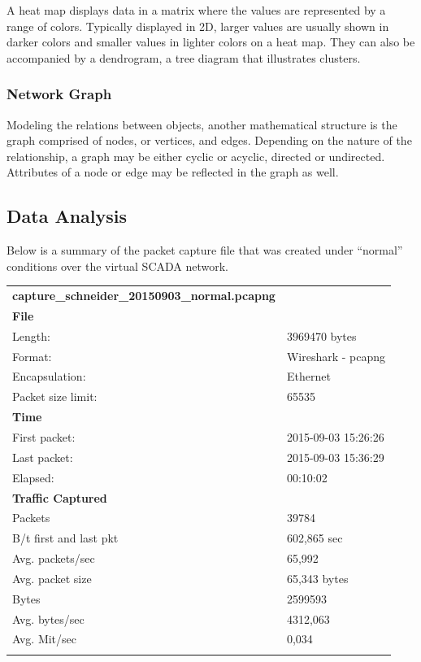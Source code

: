 \documentclass[11pt,]{article}
\begin{document}
A heat map displays data in a matrix where the values are represented by
a range of colors. Typically displayed in 2D, larger values are usually
shown in darker colors and smaller values in lighter colors on a heat
map. They can also be accompanied by a dendrogram, a tree diagram that
illustrates clusters.

\subsubsection{Network Graph}\label{network-graph}

Modeling the relations between objects, another mathematical structure
is the graph comprised of nodes, or vertices, and edges. Depending on
the nature of the relationship, a graph may be either cyclic or acyclic,
directed or undirected. Attributes of a node or edge may be reflected in
the graph as well.

\subsection{Data Analysis}\label{data-analysis}

Below is a summary of the packet capture file that was created under
``normal'' conditions over the virtual SCADA network.

\begin{longtable}[c]{@{}ll@{}}
\toprule\addlinespace
\textbf{capture\_schneider\_20150903\_normal.pcapng} &
\\\addlinespace
\midrule\endhead
\textbf{File} &
\\\addlinespace
Length: & 3969470 bytes
\\\addlinespace
Format: & Wireshark - pcapng
\\\addlinespace
Encapsulation: & Ethernet
\\\addlinespace
Packet size limit: & 65535
\\\addlinespace
\textbf{Time} &
\\\addlinespace
First packet: & 2015-09-03 15:26:26
\\\addlinespace
Last packet: & 2015-09-03 15:36:29
\\\addlinespace
Elapsed: & 00:10:02
\\\addlinespace
\textbf{Traffic Captured} &
\\\addlinespace
Packets & 39784
\\\addlinespace
B/t first and last pkt & 602,865 sec
\\\addlinespace
Avg. packets/sec & 65,992
\\\addlinespace
Avg. packet size & 65,343 bytes
\\\addlinespace
Bytes & 2599593
\\\addlinespace
Avg. bytes/sec & 4312,063
\\\addlinespace
Avg. Mit/sec & 0,034
\\\addlinespace
\bottomrule
\end{longtable}
\end{document}
